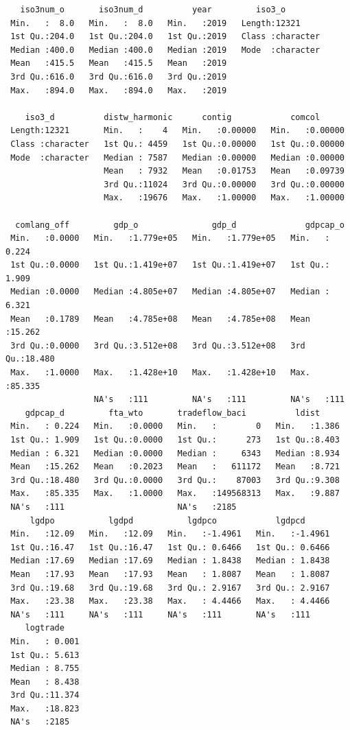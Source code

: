 \documentclass[
  a4paper,
  DIV=11,
  numbers=noendperiod]{scrreprt}
\begin{document}
\begin{verbatim}
   iso3num_o       iso3num_d          year         iso3_o         
 Min.   :  8.0   Min.   :  8.0   Min.   :2019   Length:12321      
 1st Qu.:204.0   1st Qu.:204.0   1st Qu.:2019   Class :character  
 Median :400.0   Median :400.0   Median :2019   Mode  :character  
 Mean   :415.5   Mean   :415.5   Mean   :2019                     
 3rd Qu.:616.0   3rd Qu.:616.0   3rd Qu.:2019                     
 Max.   :894.0   Max.   :894.0   Max.   :2019                     
                                                                  
    iso3_d          distw_harmonic      contig            comcol       
 Length:12321       Min.   :    4   Min.   :0.00000   Min.   :0.00000  
 Class :character   1st Qu.: 4459   1st Qu.:0.00000   1st Qu.:0.00000  
 Mode  :character   Median : 7587   Median :0.00000   Median :0.00000  
                    Mean   : 7932   Mean   :0.01753   Mean   :0.09739  
                    3rd Qu.:11024   3rd Qu.:0.00000   3rd Qu.:0.00000  
                    Max.   :19676   Max.   :1.00000   Max.   :1.00000  
                                                                       
  comlang_off         gdp_o               gdp_d              gdpcap_o     
 Min.   :0.0000   Min.   :1.779e+05   Min.   :1.779e+05   Min.   : 0.224  
 1st Qu.:0.0000   1st Qu.:1.419e+07   1st Qu.:1.419e+07   1st Qu.: 1.909  
 Median :0.0000   Median :4.805e+07   Median :4.805e+07   Median : 6.321  
 Mean   :0.1789   Mean   :4.785e+08   Mean   :4.785e+08   Mean   :15.262  
 3rd Qu.:0.0000   3rd Qu.:3.512e+08   3rd Qu.:3.512e+08   3rd Qu.:18.480  
 Max.   :1.0000   Max.   :1.428e+10   Max.   :1.428e+10   Max.   :85.335  
                  NA's   :111         NA's   :111         NA's   :111     
    gdpcap_d         fta_wto       tradeflow_baci          ldist      
 Min.   : 0.224   Min.   :0.0000   Min.   :        0   Min.   :1.386  
 1st Qu.: 1.909   1st Qu.:0.0000   1st Qu.:      273   1st Qu.:8.403  
 Median : 6.321   Median :0.0000   Median :     6343   Median :8.934  
 Mean   :15.262   Mean   :0.2023   Mean   :   611172   Mean   :8.721  
 3rd Qu.:18.480   3rd Qu.:0.0000   3rd Qu.:    87003   3rd Qu.:9.308  
 Max.   :85.335   Max.   :1.0000   Max.   :149568313   Max.   :9.887  
 NA's   :111                       NA's   :2185                       
     lgdpo           lgdpd           lgdpco            lgdpcd       
 Min.   :12.09   Min.   :12.09   Min.   :-1.4961   Min.   :-1.4961  
 1st Qu.:16.47   1st Qu.:16.47   1st Qu.: 0.6466   1st Qu.: 0.6466  
 Median :17.69   Median :17.69   Median : 1.8438   Median : 1.8438  
 Mean   :17.93   Mean   :17.93   Mean   : 1.8087   Mean   : 1.8087  
 3rd Qu.:19.68   3rd Qu.:19.68   3rd Qu.: 2.9167   3rd Qu.: 2.9167  
 Max.   :23.38   Max.   :23.38   Max.   : 4.4466   Max.   : 4.4466  
 NA's   :111     NA's   :111     NA's   :111       NA's   :111      
    logtrade     
 Min.   : 0.001  
 1st Qu.: 5.613  
 Median : 8.755  
 Mean   : 8.438  
 3rd Qu.:11.374  
 Max.   :18.823  
 NA's   :2185    
\end{verbatim}
\end{document}
